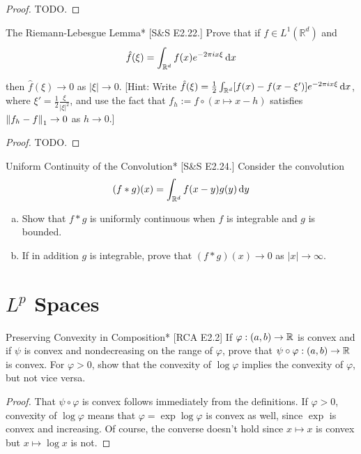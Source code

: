 \begin{proof}
    TODO. 
\end{proof}


\begin{problem}{The Riemann-Lebesgue Lemma}*
    [S\&S E2.22.] Prove that if \(f \in L^1(\mathbb{R}^d)\) and 
    \[
        \hat{f}(\xi) = \int_{\mathbb{R}^d} f(x) e^{-2\pi i x \xi} \, \mathrm{d}x
    \]

    then \(\hat{f}(\xi) \to 0\) as \(|\xi| \to 0\). [Hint: Write \(\hat{f}(\xi) = \frac{1}{2} \int_{\mathbb{R}^d} [f(x) - f(x -\xi')] e^{-2\pi ix \xi} \, \mathrm{d}x\), where \(\xi' = \frac{1}{2} \frac{\xi}{|\xi|^2}\), and use the fact that \(f_h := f \circ (x \mapsto x -h)\) satisfies \(\norm{f_h - f}_1 \to 0\) as \(h \to 0\).]
\end{problem}

\begin{proof}
    TODO. 
\end{proof}



\begin{problem}{Uniform Continuity of the Convolution}*
    [S\&S E2.24.] Consider the convolution 
    \[
        (f*g)(x) = \int_{\mathbb{R}^d} f(x - y) g(y) \, \mathrm{d}y
    \]

    \begin{enumerate}[(a)]
        \itemsep0em
        \item Show that \(f*g\) is uniformly continuous when \(f\) is integrable and \(g\) is bounded. 
        \item If in addition \(g\) is integrable, prove that \((f*g)(x) \to 0\) as \(|x| \to \infty\). 
    \end{enumerate}
\end{problem}


\newpage
\section{\(L^p\) Spaces}


\begin{problem}{Preserving Convexity in Composition}*
    [RCA E2.2] If \(\varphi : (a, b) \to \mathbb{R}\) is convex and if \(\psi\) is convex and nondecreasing on the range of \(\varphi\), prove that \(\psi \circ \varphi : (a, b) \to \mathbb{R}\) is convex. For \(\varphi > 0\), show that the convexity of \(\log\varphi\) implies the convexity of \(\varphi\), but not vice versa. 
\end{problem}

\begin{proof}
    That \(\psi \circ \varphi\) is convex follows immediately from the definitions. If \(\varphi > 0\), convexity of \(\log\varphi\) means that \(\varphi = \exp \log \varphi\) is convex as well, since \(\exp\) is convex and increasing. Of course, the converse doesn't hold since \(x \mapsto x\) is convex but \(x \mapsto \log x\) is not.
\end{proof}


